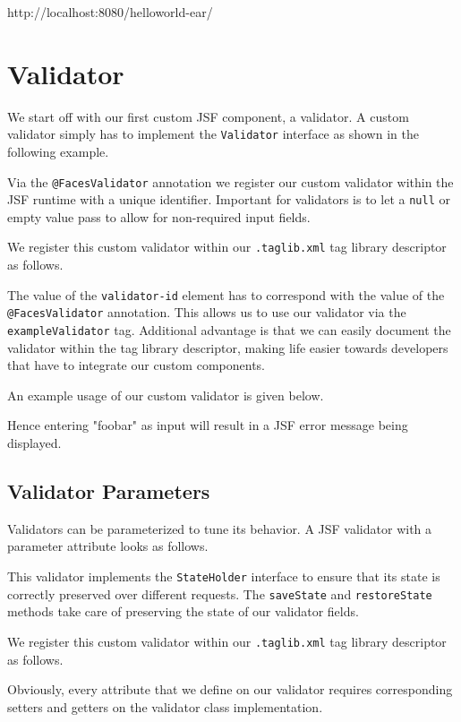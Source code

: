 http://localhost:8080/helloworld-ear/

\section{Validator}
\label{sec:validator}
We start off with our first custom JSF component, a validator.
A custom validator simply has to implement the \texttt{Validator} interface as shown in the following example.

Via the \texttt{@FacesValidator} annotation we register our custom validator within the JSF runtime with a unique identifier.
Important for validators is to let a \texttt{null} or empty value pass to allow for non-required input fields.

We register this custom validator within our \texttt{.taglib.xml} tag library descriptor as follows.

The value of the \texttt{validator-id} element has to correspond with the value of the \texttt{@FacesValidator} annotation.
This allows us to use our validator via the \texttt{exampleValidator} tag.
Additional advantage is that we can easily document the validator within the tag library descriptor, making life easier towards developers that have to integrate our custom components.

An example usage of our custom validator is given below.

Hence entering "foobar" as input will result in a JSF error message being displayed.


\subsection{Validator Parameters}
Validators can be parameterized to tune its behavior. 
A JSF  validator with a parameter attribute looks as follows.

This validator implements the \texttt{StateHolder} interface to ensure that its state is correctly preserved over different requests.
The \texttt{saveState} and \texttt{restoreState} methods take care of preserving the state of our validator fields.

We register this custom validator within our \texttt{.taglib.xml} tag library descriptor as follows.

Obviously, every attribute that we define on our validator requires corresponding setters and getters on the validator class implementation.

